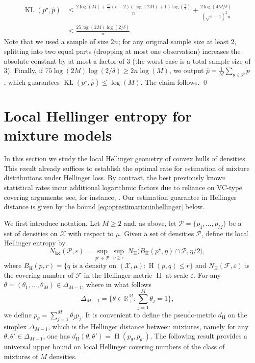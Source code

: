 \documentclass[11pt]{article}
\newcommand{\R}{\mathbb R}
\renewcommand{\geq}{\geqslant}
\renewcommand{\le}{\leqslant}
\renewcommand{\ge}{\geqslant}
\newcommand{\eps}{\varepsilon}
\newcommand{\M}{M}
\newcommand{\X}{\mathcal{X}}
\newcommand{\nloc}{N_{\mathsf{loc}}}
\newcommand{\kl}{\operatorname{KL}}
\newcommand{\hel}{\operatorname{H}}
\theoremstyle{definition}
\theoremstyle{remark}
\begin{document}
\begin{align*}
\kl(p^\star, \widehat{p}) &\le \frac{2\log(M) + \frac{25}{4}\left(e-2\right)\left(\log(2M)+1\right)\log\left(\frac{2}{\delta}\right)}{n} + \frac{2\log (4\M/\delta)}{(\sqrt{e}-1)^2n}
\\
&\le \frac{25\log(2M)\log(2/\delta)}{n}.
\end{align*}
Note that we used a sample of size $2n$; for any original sample size at least $2$, splitting into two equal parts (dropping at most one observation) increases the absolute constant by at most a factor of $3$ (the worst case is a total sample size of $3$). Finally, if $75\log(2M)\log(2/\delta) \ge 2n\log(M)$, we output $\widehat{p} = \frac{1}{M}\sum\limits_{p \in \mathcal{P}}p$, which guarantees $\kl(p^\star, \widehat{p}) \le \log(M)$. The claim follows. \qed

\section{Local Hellinger entropy for mixture models
}
\label{sec:local-cover-numb}

In this section we study the local Hellinger geometry of convex hulls of densities. This result already suffices to establish the optimal rate for
estimation of mixture distributions under Hellinger loss.
By contrast, the best previously known statistical rates incur additional logarithmic factors due to reliance on VC-type covering arguments; see, for instance, \cite[Proposition~7 and Corollary~3]{baraud2018rho}.
Our estimation guarantee in Hellinger distance is given by the bound \eqref{eq:optestimationinhellinger} below.


We first introduce notation. Let $\M \geq 2$ and, as above, let $\mathcal{P} = \{p_1, \dots, p_\M\}$ be a set of densities on $\mathcal{X}$ with respect to $\mu$.
Given a set of densities $\mathcal P$, define its local Hellinger entropy by
\begin{equation}
\label{eq:localentropy}
\nloc(\mathcal{P},\eps)
=
\sup\limits_{p^\star \in \mathcal P}\sup_{\eta\ge \eps}\ N_{\hel}\big(B_{\hel}(p^\star,\eta)\cap\mathcal{P},\eta/2\big),
\end{equation}
where $B_{\hel}(p,r)=\{q \text{ is a density on } (\X, \mu):\hel(p,q)\le r\}$ and $N_{\hel}(\mathcal{F},\eps)$ is the covering number of $\mathcal{F}$ in the Hellinger metric $\hel$ at scale $\eps$. For any $\theta = (\theta_1, \dots, \theta_\M) \in \Delta_{\M-1}$, where in what follows
\[
\Delta_{\M-1} = \bigg\{\theta \in \R^M_{+}: \sum_{j = 1}^M \theta_{j} = 1 \bigg\},
\]
we define $p_\theta = \sum_{j=1}^M \theta_j p_j$. It is convenient to define the pseudo-metric $d_{\hel}$ on the simplex $\Delta_{\M-1}$, which is the Hellinger distance between mixtures, namely for any $\theta, \theta' \in \Delta_{\M-1}$, one has $d_{\hel} (\theta, \theta') = \hel (p_\theta, p_{\theta'})$. The following result provides a universal upper bound on local Hellinger covering numbers of the class of mixtures of $\M$ densities.
\end{document}
